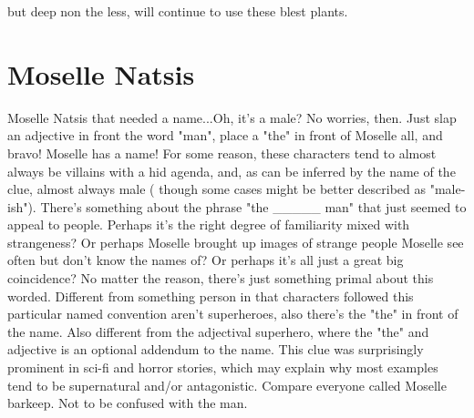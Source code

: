 \documentclass[12pt]{book}
\begin{document}
but deep non the less, will continue to use these blest plants.



\chapter{Moselle Natsis}

Moselle Natsis that needed a name...Oh, it's a male? No worries, then. Just slap an adjective in front the word "man", place a "the" in front of Moselle all, and bravo! Moselle has a name! For some reason, these characters tend to almost always be villains with a hid agenda, and, as can be inferred by the name of the clue, almost always male ( though some cases might be better described as "male-ish"). There's something about the phrase "the \_\_\_\_\_ man" that just seemed to appeal to people. Perhaps it's the right degree of familiarity mixed with strangeness? Or perhaps Moselle brought up images of strange people Moselle see often but don't know the names of? Or perhaps it's all just a great big coincidence? No matter the reason, there's just something primal about this worded. Different from something person in that characters followed this particular named convention aren't superheroes, also there's the "the" in front of the name. Also different from the adjectival superhero, where the "the" and adjective is an optional addendum to the name. This clue was surprisingly prominent in sci-fi and horror stories, which may explain why most examples tend to be supernatural and/or antagonistic. Compare everyone called Moselle barkeep. Not to be confused with the man.
\end{document}
